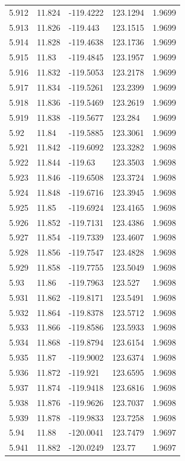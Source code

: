 \begin{tabular}{lllll}
5.912 & 11.824 & -119.4222 & 123.1294 & 1.9699 \\
5.913 & 11.826 & -119.443 & 123.1515 & 1.9699 \\
5.914 & 11.828 & -119.4638 & 123.1736 & 1.9699 \\
5.915 & 11.83 & -119.4845 & 123.1957 & 1.9699 \\
5.916 & 11.832 & -119.5053 & 123.2178 & 1.9699 \\
5.917 & 11.834 & -119.5261 & 123.2399 & 1.9699 \\
5.918 & 11.836 & -119.5469 & 123.2619 & 1.9699 \\
5.919 & 11.838 & -119.5677 & 123.284 & 1.9699 \\
5.92 & 11.84 & -119.5885 & 123.3061 & 1.9699 \\
5.921 & 11.842 & -119.6092 & 123.3282 & 1.9698 \\
5.922 & 11.844 & -119.63 & 123.3503 & 1.9698 \\
5.923 & 11.846 & -119.6508 & 123.3724 & 1.9698 \\
5.924 & 11.848 & -119.6716 & 123.3945 & 1.9698 \\
5.925 & 11.85 & -119.6924 & 123.4165 & 1.9698 \\
5.926 & 11.852 & -119.7131 & 123.4386 & 1.9698 \\
5.927 & 11.854 & -119.7339 & 123.4607 & 1.9698 \\
5.928 & 11.856 & -119.7547 & 123.4828 & 1.9698 \\
5.929 & 11.858 & -119.7755 & 123.5049 & 1.9698 \\
5.93 & 11.86 & -119.7963 & 123.527 & 1.9698 \\
5.931 & 11.862 & -119.8171 & 123.5491 & 1.9698 \\
5.932 & 11.864 & -119.8378 & 123.5712 & 1.9698 \\
5.933 & 11.866 & -119.8586 & 123.5933 & 1.9698 \\
5.934 & 11.868 & -119.8794 & 123.6154 & 1.9698 \\
5.935 & 11.87 & -119.9002 & 123.6374 & 1.9698 \\
5.936 & 11.872 & -119.921 & 123.6595 & 1.9698 \\
5.937 & 11.874 & -119.9418 & 123.6816 & 1.9698 \\
5.938 & 11.876 & -119.9626 & 123.7037 & 1.9698 \\
5.939 & 11.878 & -119.9833 & 123.7258 & 1.9698 \\
5.94 & 11.88 & -120.0041 & 123.7479 & 1.9697 \\
5.941 & 11.882 & -120.0249 & 123.77 & 1.9697 \\

\end{tabular}
